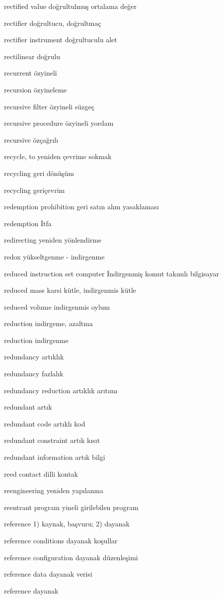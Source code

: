 \documentclass[12pt,fleqn]{article}\usepackage{../../common}
\begin{document}
rectified value doğrultulmuş ortalama değer

rectifier doğrultucu, doğrultmaç

rectifier instrument doğrultuculu alet

rectilinear doğrulu

recurrent özyineli

recursion özyineleme

recursive filter özyineli süzgeç

recursive procedure özyineli yordam

recursive özçağrılı

recycle, to yeniden çevrime sokmak

recycling geri dönüşüm

recycling geriçevrim

redemption prohibition geri satın alım yasaklaması

redemption İtfa

redirecting yeniden yönlendirme

redox yükseltgenme - indirgenme

reduced instruction set computer İndirgenmiş komut takımlı bilgisayar

reduced mass karsi kütle, indirgenmis kütle

reduced volume indirgenmis oylum

reduction indirgeme, azaltma

reduction indirgenme

redundancy artıklık

redundancy fazlalık

redundancy reduction artıklık arıtımı

redundant artık

redundant code artıklı kod

redundant constraint artık kısıt

redundant information artık bilgi

reed contact dilli kontak

reengineering yeniden yapılanma

reentrant program yineli girilebilen program

reference 1) kaynak, başvuru; 2) dayanak

reference conditions dayanak koşullar

reference configuration dayanak düzenleşimi

reference data dayanak verisi

reference dayanak
\end{document}
